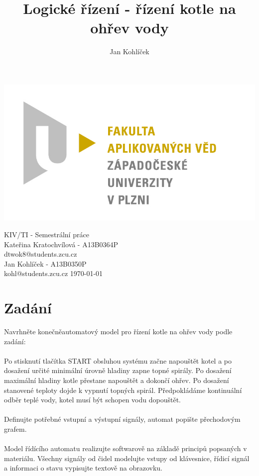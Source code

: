 \documentclass[12pt]{report}
\title{Logické řízení - řízení kotle na ohřev vody}
\author{Jan Kohlíček}
\begin{document}
\begin{titlepage}
\begin{flushleft} 
{\includegraphics[width=.5\textwidth]{./images/fav_logo.jpg}\\[3cm]}
\end{flushleft}
\begin{center}

{\Huge KIV/TI - Semestrální práce}
\\[0.3cm]
\vspace{1.7cm}
{\Large Kateřina Kratochvílová - A13B0364P}\\
\vspace{0.2cm}
{\normalsize dtwok8@students.zcu.cz}\\
\vspace{1cm}
{\Large Jan Kohlíček - A13B0350P}\\
\vspace{0.2cm}
{\normalsize kohl@students.zcu.cz }
\vfill
{\large \today}
\end{center}
\end{titlepage}

\tableofcontents
\thispagestyle{empty}



\chapter{Zadání}
\setcounter{page}{1}
Navrhněte konečněautomatový model pro řízení kotle na ohřev vody podle zadání:\\
\\
Po stisknutí tlačítka START obsluhou systému začne napouštět kotel a po dosažení určité minimální úrovně hladiny zapne topné spirály. Po dosažení maximální hladiny kotle přestane napouštět a dokončí ohřev. Po dosažení stanovené teploty dojde k vypnutí topných spirál. Předpokládáme kontinuální odběr teplé vody, kotel musí být schopen vodu dopouštět.\\
\\
Definujte potřebné vstupní a výstupní signály, automat popište přechodovým grafem.\\
\\
Model řídícího automatu realizujte softwarově na základě principů popsaných v materiálu. Všechny signály od čidel modelujte vstupy od klávesnice, řídicí signál a informaci o stavu vypisujte textově na obrazovku.\\
\end{document}
